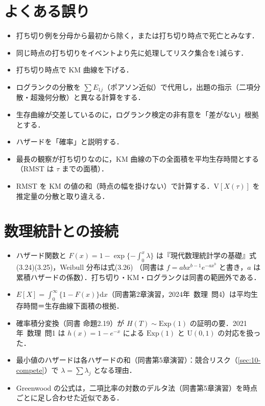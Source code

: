 \documentclass[a4paper,11pt,openany]{ltjsbook}
\newcommand{\kakomonSM}[2]{\mbox{#1年 数理 問#2}}
\newcommand{\V}{\mathrm{V}}
\newcommand{\dd}{\mathrm{d}}
\newcommand{\Ex}{\mathrm{Exp}}
\newcommand{\Unif}{\mathrm{U}}
\begin{document}
\section{よくある誤り}\label{sec:09-err}
\begin{warnbox}
\begin{itemize}
\item 打ち切り例を分母から最初から除く，または打ち切り時点で死亡とみなす．
\item 同じ時点の打ち切りをイベントより先に処理してリスク集合を1減らす．
\item 打ち切り時点で KM 曲線を下げる．
\item ログランクの分散を $\sum E_{1j}$（ポアソン近似）で代用し，出題の指示（二項分散・超幾何分散）と異なる計算をする．
\item 生存曲線が交差しているのに，ログランク検定の非有意を「差がない」根拠とする．
\item ハザードを「確率」と説明する．
\item 最長の観察が打ち切りなのに，KM 曲線の下の全面積を平均生存時間とする（RMST は $\tau$ までの面積）．
\item RMST を KM の値の和（時点の幅を掛けない）で計算する．$\V[X(\tau)]$ を推定量の分散と取り違える．
\end{itemize}
\end{warnbox}

\section{数理統計との接続}\label{sec:09-link}
\begin{linkbox}
\begin{itemize}
\item ハザード関数と $F(x)=1-\exp\{-\int_0^x\lambda\}$ は『現代数理統計学の基礎』式(3.24)(3.25)，Weibull 分布は式(3.26)
      （同書は $f=abx^{b-1}e^{-ax^b}$ と書き，$a$ は累積ハザードの係数）．打ち切り・KM・ログランクは同書の範囲外である．
\item $E[X]=\int_0^\infty\{1-F(x)\}\dd x$（同書第2章演習，\kakomonSM{2024}{4}）は平均生存時間＝生存曲線下面積の根拠．
\item 確率積分変換（同書 命題2.19）が $H(T)\sim\Ex(1)$ の証明の要．\kakomonSM{2021}{1} は $h(x)=1-e^{-x}$ による $\Ex(1)$ と $\Unif(0,1)$ の対応を扱った．
\item 最小値のハザードは各ハザードの和（同書第5章演習）：競合リスク（\cref{sec:10-compete}）で $\lambda=\sum\lambda_j$ となる理由．
\item Greenwood の公式は，二項比率の対数のデルタ法（同書第5章演習）を時点ごとに足し合わせた近似である．
\end{itemize}
\end{linkbox}
\end{document}
